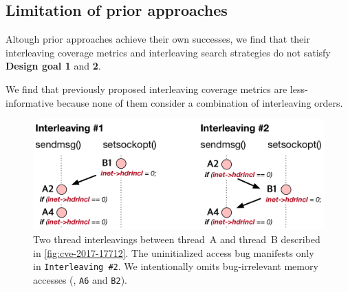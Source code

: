 \subsection{Limitation of prior approaches}
\label{ss:existingapproaches}
%
%   

%
Altough prior approaches achieve their own successes, we find that
their interleaving coverage metrics and interleaving search strategies
do not satisfy \textbf{Design goal 1} and \textbf{2}.


%
We find that previously proposed interleaving coverage metrics are
less-informative because none of them consider a combination of
interleaving orders.

\begin{figure}[t]
  \centering
  \includegraphics[width=0.8\linewidth]{fig/alias-coverage.pdf}
  \caption{Two thread interleavings between thread~A and thread~B
    described in \autoref{fig:cve-2017-17712}.
    The uninitialized access bug manifests only in
    \texttt{Interleaving \#2}.
    We intentionally omits bug-irrelevant memory accesses (\ie,
    \texttt{A6} and \texttt{B2}).}
  \label{fig:alias-coverage}
\end{figure}



